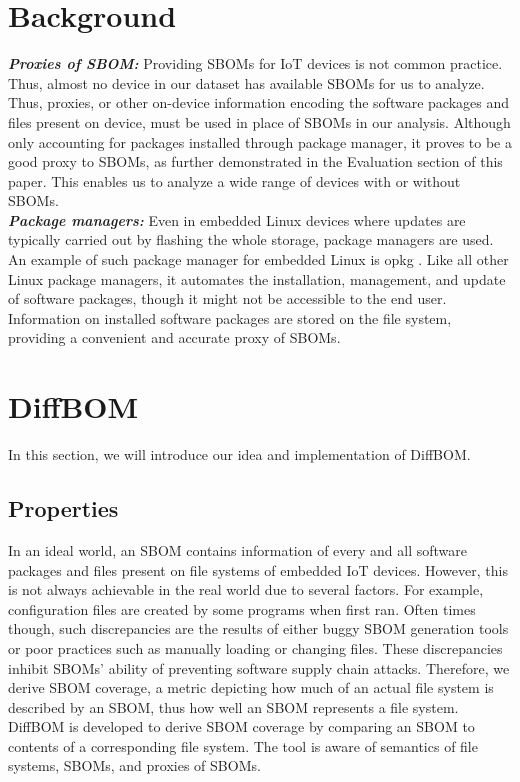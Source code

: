 \section{Background}
\textbf{\textit{Proxies of SBOM:}} Providing SBOMs for IoT devices is not common practice. Thus, almost no device in our dataset has available SBOMs for us to analyze. Thus, proxies, or other on-device information encoding the software packages and files present on device, must be used in place of SBOMs in our analysis. Although only accounting for packages installed through package manager, it proves to be a good proxy to SBOMs, as further demonstrated in the Evaluation section of this paper. This enables us to analyze a wide range of devices with or without SBOMs. \\
\textbf{\textit{Package managers:}} Even in embedded Linux devices where updates are typically carried out by flashing the whole storage, package managers are used. An example of such package manager for embedded Linux is opkg \cite{opkg}. Like all other Linux package managers, it automates the installation, management, and update of software packages, though it might not be accessible to the end user. Information on installed software packages are stored on the file system, providing a convenient and accurate proxy of SBOMs.

\section{DiffBOM}
In this section, we will introduce our idea and implementation of DiffBOM.
\subsection{Properties}
In an ideal world, an SBOM contains information of every and all software packages and files present on file systems of embedded IoT devices. However, this is not always achievable in the real world due to several factors. For example, configuration files are created by some programs when first ran. Often times though, such discrepancies are the results of either buggy SBOM generation tools or poor practices such as manually loading or changing files. These discrepancies inhibit SBOMs' ability of preventing software supply chain attacks. Therefore, we derive SBOM coverage, a metric depicting how much of an actual file system is described by an SBOM, thus how well an SBOM represents a file system. DiffBOM is developed to derive SBOM coverage by comparing an SBOM to contents of a corresponding file system. The tool is aware of semantics of file systems, SBOMs, and proxies of SBOMs. %
